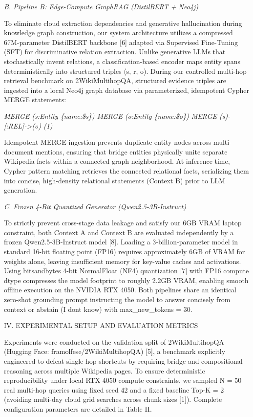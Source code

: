 \emph{B. Pipeline B: Edge-Compute GraphRAG (DistilBERT + Neo4j)}

To eliminate cloud extraction dependencies and generative hallucination
during knowledge graph construction, our system architecture utilizes a
compressed 67M-parameter DistilBERT backbone {[}6{]} adapted via
Supervised Fine-Tuning (SFT) for discriminative relation extraction.
Unlike generative LLMs that stochastically invent relations, a
classification-based encoder maps entity spans deterministically into
structured triples (s, r, o). During our controlled multi-hop retrieval
benchmark on 2WikiMultihopQA, structured evidence triples are ingested
into a local Neo4j graph database via parameterized, idempotent Cypher
MERGE statements:

\emph{MERGE (s:Entity \{name:\$s\}) MERGE (o:Entity \{name:\$o\}) MERGE
(s)-{[}:REL{]}-\textgreater(o) (1)}

Idempotent MERGE ingestion prevents duplicate entity nodes across
multi-document mentions, ensuring that bridge entities physically unite
separate Wikipedia facts within a connected graph neighborhood. At
inference time, Cypher pattern matching retrieves the connected
relational facts, serializing them into concise, high-density relational
statements (Context B) prior to LLM generation.

\emph{C. Frozen 4-Bit Quantized Generator (Qwen2.5-3B-Instruct)}

To strictly prevent cross-stage data leakage and satisfy our 6GB VRAM
laptop constraint, both Context A and Context B are evaluated
independently by a frozen Qwen2.5-3B-Instruct model {[}8{]}. Loading a
3-billion-parameter model in standard 16-bit floating point (FP16)
requires approximately 6GB of VRAM for weights alone, leaving
insufficient memory for key-value caches and activations. Using
bitsandbytes 4-bit NormalFloat (NF4) quantization {[}7{]} with FP16
compute dtype compresses the model footprint to roughly 2.2GB VRAM,
enabling smooth offline execution on the NVIDIA RTX 4050. Both pipelines
share an identical zero-shot grounding prompt instructing the model to
answer concisely from context or abstain (\textquotesingle I
don\textquotesingle t know\textquotesingle) with max\_new\_tokens = 30.

\textsc{IV. EXPERIMENTAL SETUP AND EVALUATION METRICS}

Experiments were conducted on the validation split of 2WikiMultihopQA
(Hugging Face: framolfese/2WikiMultihopQA) {[}5{]}, a benchmark
explicitly engineered to defeat single-hop shortcuts by requiring bridge
and compositional reasoning across multiple Wikipedia pages. To ensure
deterministic reproducibility under local RTX 4050 compute constraints,
we sampled N = 50 real multi-hop queries using fixed seed 42 and a fixed
baseline Top-K = 2 (avoiding multi-day cloud grid searches across chunk
sizes {[}1{]}). Complete configuration parameters are detailed in Table
II.

